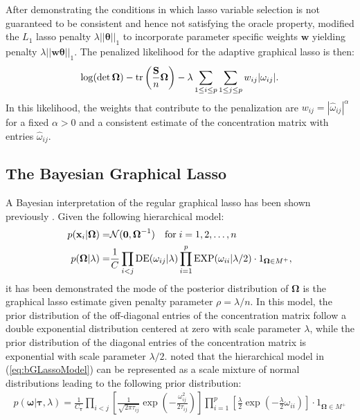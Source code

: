 \begin{DoubleSpace*}
After demonstrating the conditions in which lasso variable selection is not guaranteed to be consistent and hence not satisfying the oracle property, \cite{zou2006} modified the $L_1$ lasso penalty $\lambda ||\boldsymbol{\theta}||_1$ to incorporate parameter specific weights $\textbf{w}$  yielding penalty $\lambda ||\textbf{w} \boldsymbol{\theta}||_1$. The penalized likelihood for the adaptive graphical lasso is then:
\begin{align}
\log(\det \boldsymbol{\Omega})-\operatorname{tr} \left(\frac{\mathbf{S}}{n} \boldsymbol{\Omega}\right) - \lambda \sum_{1\leq i \leq p} \sum_{1 \leq j \leq p} w_{ij} |\omega_{ij}|.
\end{align}
In this likelihood, the weights that contribute to the penalization are $w_{ij}=|\hat{\omega}_{ij}|^\alpha$ for a fixed $\alpha >0$ and a consistent estimate of the concentration matrix with entries $\hat{\omega}_{ij}$.

\subsection{The Bayesian Graphical Lasso}
A Bayesian interpretation of the regular graphical lasso \cite{friedman2007} has been shown previously \cite{wang2012}. Given the following hierarchical model:
\begin{align}
p(\textbf{x}_i|\boldsymbol{\Omega}) =& \mathcal{N}(\textbf{0},\boldsymbol{\Omega}^{-1}) \quad \text{for} \; i=1,2,\hdots,n\\
p(\boldsymbol{\Omega}|\lambda) =& \frac{1}{C} \prod_{i<j} \operatorname{DE}(\omega_{ij}|\lambda) \prod_{i=1}^{p} \operatorname{EXP} (\omega_{ii} | \lambda / 2) \cdot 1_{\boldsymbol{\Omega}\in M^+},
\label{eq:bGLassoModel}
\end{align}
it has been demonstrated the mode of the posterior distribution of $\boldsymbol{\Omega}$ is the graphical lasso estimate given penalty parameter $\rho=\lambda/n$. In this model, the prior distribution of the off-diagonal entries of the concentration matrix follow a double exponential distribution centered at zero with scale parameter $\lambda$, while the prior distribution of the diagonal entries of the concentration matrix is exponential with scale parameter $\lambda/2$. \cite{wang2012}  noted that the hierarchical model in (\ref{eq:bGLassoModel}) can be represented as a scale mixture of normal distributions \cite{andrews1974,west1987} leading to the following prior distribution:
\begin{align}
p(\boldsymbol{\omega}| \boldsymbol{\tau},\lambda)=\frac{1}{C_{\boldsymbol{\tau}}} \prod_{i<j} \left[ \frac{1}{\sqrt{2\pi \tau_{ij}}} \exp \left(- \frac{\omega_{ij}^2}{2\tau_{ij}}\right) \right] \prod_{i=1}^{p} \left[\frac{\lambda}{2} \exp \left(-\frac{\lambda}{2}\omega_{ii} \right)\right] \cdot 1_{\boldsymbol{\Omega}\in M^+}
\end{align}


\end{DoubleSpace*}
